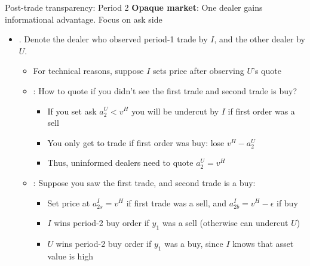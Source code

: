 \documentclass[english,10pt
,aspectratio=169
]{beamer}
\begin{document}
\begin{frame}{Post-trade transparency: Period 2}
	\textbf{Opaque market}: One dealer gains informational advantage. Focus on \alert{ask side}
	\begin{itemize}
		\item {}. Denote the dealer who observed period-1 trade by \alert{$I$}, and the other dealer by \alert{$U$}.
		\begin{itemize}
			\item For technical reasons, suppose $I$ sets price after observing $U$'s quote
			\item {}: How to quote if you didn't see the first trade and second trade is buy? 
			\begin{itemize}
				\item If you set ask $a^U_2<v^{H}$ you will be undercut by $I$  if first order was a sell
				\item You only get to trade if first order was buy: lose $v^{H}-a^U_2$
				\item Thus, uninformed dealers need to quote $a^U_2=v^{H}$
			\end{itemize}
			\item {}: Suppose you saw the first trade, and second trade is a buy:
			\begin{itemize}
				\item Set price at $a^I_{2s}=v^{H}$ if first trade was a sell, and $a^I_{2b} = v^H - \epsilon$ if buy
				\item  $I$ wins period-2 buy order if $y_1$ was a sell (otherwise can undercut $U$)
				\item  $U$ wins period-2 buy order if $y_1$ was a buy, since $I$ knows that asset value is high
			\end{itemize}
		\end{itemize}
	\end{itemize}
\end{frame}
\end{document}
